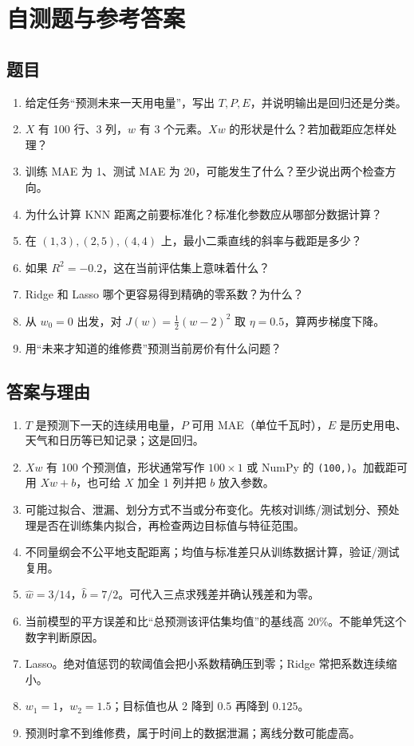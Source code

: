 \documentclass[UTF8,11pt,oneside]{ctexbook}
\begin{document}
\chapter{自测题与参考答案}
\section*{题目}
\begin{enumerate}
\item 给定任务“预测未来一天用电量”，写出 $T,P,E$，并说明输出是回归还是分类。
\item $X$ 有 100 行、3 列，$w$ 有 3 个元素。$Xw$ 的形状是什么？若加截距应怎样处理？
\item 训练 MAE 为 1、测试 MAE 为 20，可能发生了什么？至少说出两个检查方向。
\item 为什么计算 KNN 距离之前要标准化？标准化参数应从哪部分数据计算？
\item 在 $(1,3),(2,5),(4,4)$ 上，最小二乘直线的斜率与截距是多少？
\item 如果 $R^2=-0.2$，这在当前评估集上意味着什么？
\item Ridge 和 Lasso 哪个更容易得到精确的零系数？为什么？
\item 从 $w_0=0$ 出发，对 $J(w)=\frac12(w-2)^2$ 取 $\eta=0.5$，算两步梯度下降。
\item 用“未来才知道的维修费”预测当前房价有什么问题？
\end{enumerate}
\section*{答案与理由}
\begin{enumerate}
\item $T$ 是预测下一天的连续用电量，$P$ 可用 MAE（单位千瓦时），$E$ 是历史用电、天气和日历等已知记录；这是回归。
\item $Xw$ 有 100 个预测值，形状通常写作 $100\times1$ 或 NumPy 的 \texttt{(100,)}。加截距可用 $Xw+b$，也可给 $X$ 加全 1 列并把 $b$ 放入参数。
\item 可能过拟合、泄漏、划分方式不当或分布变化。先核对训练/测试划分、预处理是否在训练集内拟合，再检查两边目标值与特征范围。
\item 不同量纲会不公平地支配距离；均值与标准差只从训练数据计算，验证/测试复用。
\item $\hat w=3/14$，$\hat b=7/2$。可代入三点求残差并确认残差和为零。
\item 当前模型的平方误差和比“总预测该评估集均值”的基线高 20\%。不能单凭这个数字判断原因。
\item Lasso。绝对值惩罚的软阈值会把小系数精确压到零；Ridge 常把系数连续缩小。
\item $w_1=1$，$w_2=1.5$；目标值也从 2 降到 $0.5$ 再降到 $0.125$。
\item 预测时拿不到维修费，属于时间上的数据泄漏；离线分数可能虚高。
\end{enumerate}
\end{document}
